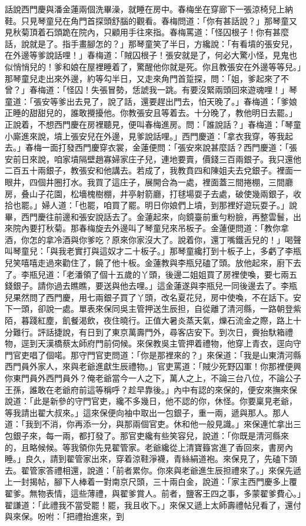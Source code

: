 \begin{showcontents}{}
話說西門慶與潘金蓮兩個洗畢澡，就睡在房中。春梅坐在穿廊下一張涼椅兒上納鞋。只見琴童兒在角門首探頭舒腦的觀看。春梅問道：「你有甚話說？」那琴童又見秋菊頂着石頭跪在院內，只顧用手往來指。春梅罵道：「怪囚根子！你有甚麼話，說就是了。指手畫腳怎的？」那琴童笑了半日，方纔說：「有看墳的張安兒，在外邊等爹說話哩！」春梅道：「賊囚根子！張安就是了，何必大驚小怪，見鬼也似悄悄兒的！爹和娘在屋裡睡着了，驚醒他你就是死。你且教張安在外邊等等兒。」那琴童兒走出來外邊，約等勾半日，又走來角門首踅探，問：「姐，爹起來了不曾？」春梅道：「怪囚！失張冒勢，恁諕我一跳。有要沒緊兩頭回來遊魂哩！」琴童道：「張安等爹出去見了，說了話，還要趕出門去，怕天晚了。」春梅道：「爹娘正睡的甜甜兒的，誰敢攪擾他。你教張安且等着去。十分晚了，教他明日去罷。」正說着，不想西門慶在房裡聽見，便叫春梅進房。問：「誰說話？」春梅道：「琴童小廝進來說，墳上張安兒在外邊，見爹說話哩。」西門慶道：「拿衣我穿，等我起去。」春梅一面打發西門慶穿衣裳，金蓮便問：「張安來說甚麼話？西門慶道：「張安前日來說，咱家墳隔壁趙寡婦家庄子兒，連地要賣，價錢三百兩銀子。我只還他二百五十兩銀子，教張安和他講去。若成了，我教賁四和陳姐夫去兌銀子。裡面一眼井，四個井圈打水。我買了這庄子，展開合為一處，裡面蓋三間捲棚，三間廳房，叠山子花園，松墻槐樹棚，井亭射箭廳，打毬場耍子去處，破使幾兩銀子，收拾也罷。」婦人道：「也罷，咱買了罷。明日你娘們上墳，到那裡好遊玩耍子。」說畢，西門慶往前邊和張安說話去了。金蓮起來，向鏡臺前重勻粉臉，再整雲鬟，出來院內要打秋菊。那春梅旋去外邊叫了琴童兒來吊板子。金蓮便問道：「教你拿酒，你怎的拿冷酒與你爹吃？原來你家沒大了。說着你，還丁嘴鐵舌兒的！」喝聲叫琴童兒：「與我老實打與這奴才二十板子。」那琴童纔打到十板子上，多虧了李瓶兒笑嘻嘻走過來勸住了，饒了他十板。金蓮教與李瓶兒磕了頭。放他起來，廚下去了。李瓶兒道：「老潘領了個十五歲的丫頭，後邊二姐姐買了房裡使喚，要七兩五錢銀子。請你過去瞧瞧，要送與他去哩。」這金蓮遂與李瓶兒一同後邊去了。李瓶兒果然問了西門慶，用七兩銀子買了丫頭，改名夏花兒，房中使喚，不在話下。安下一頭，卻說一處。單表來保同吳主管押送生辰担，自從離了清河縣，一路朝登紫陌，暮踐紅塵，飢餐渴飲，夜住曉行。正值大暑炎蒸天氣，爍石流金之際，路上十分難行。評話捷說，有日到了東京萬壽門外，尋客店安下。到次日，賫抬馱箱禮物，逕到天漢橋蔡太師府門前伺候。來保教吳主管押着禮物，他穿上青衣，逕向守門官吏唱了個喏。那守門官吏問道：「你是那裡來的？」來保道：「我是山東清河縣西門員外家人，來與老爺進獻生辰禮物。」官吏罵道：「賊少死野囚軍！你那裡便興你東門員外西門員外？俺老爺當今一人之下，萬人之上，不論三台八位，不論公子王孫，誰敢在老爺府前這等稱呼？趁早靠後。」內中有認的來保的，便安來撫來保說道：「此是新參的守門官吏，纔不多幾日，他不認的你，休怪。你要稟見老爺，等我請出翟大叔來。」這來保便向袖中取出一包銀子，重一兩，遞與那人。那人道：「我到不消，你再添一分，與那兩個官吏。休和他一般見識。」來保連忙拿出三包銀子來，每一兩，都打發了。那官吏纔有些笑容兒，說道：「你既是清河縣來的，且略候候。等我領你先見翟管家。老爺纔從上清寶籙宮進了香回來，書房內睡。」良久，請到翟管家出來，穿着涼鞋淨襪，青絲絹道袍。來保見了，先磕下頭去。翟管家答禮相還，說道：「前者累你。你來與老爺進生辰担禮來了。」來保先遞上一封揭帖，腳下人棒着一對南京尺頭，三十兩白金，說道：「家主西門慶多上覆翟爹。無物表情，這些薄禮，與翟爹賞人。前者，鹽客王四之事，多蒙翟爹費心。」翟謙道：「此禮我不當受罷！罷，我且收下。」來保又遞上太師壽禮帖兒看了，還付與來保。吩咐：「把禮抬進來，到
\end{showcontents}
